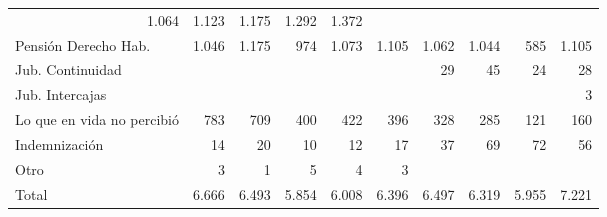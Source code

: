 \begin{tabular}{llllllllll}
  \multicolumn{1}{r}{1.064} &
  \multicolumn{1}{r}{1.123} &
  \multicolumn{1}{r}{1.175} &
  \multicolumn{1}{r}{1.292} &
  \multicolumn{1}{r}{1.372} \\
\multicolumn{1}{l}{\hspace{1em}Pensión Derecho Hab.} &
  \multicolumn{1}{|r}{1.046} &
  \multicolumn{1}{r}{1.175} &
  \multicolumn{1}{r}{974} &
  \multicolumn{1}{r}{1.073} &
  \multicolumn{1}{r}{1.105} &
  \multicolumn{1}{r}{1.062} &
  \multicolumn{1}{r}{1.044} &
  \multicolumn{1}{r}{585} &
  \multicolumn{1}{r}{1.105} \\
\multicolumn{1}{l}{\hspace{1em}Jub. Continuidad} &
  \multicolumn{1}{|r}{} &
  \multicolumn{1}{r}{} &
  \multicolumn{1}{r}{} &
  \multicolumn{1}{r}{} &
  \multicolumn{1}{r}{} &
  \multicolumn{1}{r}{29} &
  \multicolumn{1}{r}{45} &
  \multicolumn{1}{r}{24} &
  \multicolumn{1}{r}{28} \\
\multicolumn{1}{l}{\hspace{1em}Jub. Intercajas} &
  \multicolumn{1}{|r}{} &
  \multicolumn{1}{r}{} &
  \multicolumn{1}{r}{} &
  \multicolumn{1}{r}{} &
  \multicolumn{1}{r}{} &
  \multicolumn{1}{r}{} &
  \multicolumn{1}{r}{} &
  \multicolumn{1}{r}{} &
  \multicolumn{1}{r}{3} \\
\multicolumn{1}{l}{\hspace{1em}Lo que en vida no percibió} &
  \multicolumn{1}{|r}{783} &
  \multicolumn{1}{r}{709} &
  \multicolumn{1}{r}{400} &
  \multicolumn{1}{r}{422} &
  \multicolumn{1}{r}{396} &
  \multicolumn{1}{r}{328} &
  \multicolumn{1}{r}{285} &
  \multicolumn{1}{r}{121} &
  \multicolumn{1}{r}{160} \\
\multicolumn{1}{l}{\hspace{1em}Indemnización} &
  \multicolumn{1}{|r}{14} &
  \multicolumn{1}{r}{20} &
  \multicolumn{1}{r}{10} &
  \multicolumn{1}{r}{12} &
  \multicolumn{1}{r}{17} &
  \multicolumn{1}{r}{37} &
  \multicolumn{1}{r}{69} &
  \multicolumn{1}{r}{72} &
  \multicolumn{1}{r}{56} \\
\multicolumn{1}{l}{\hspace{1em}Otro} &
  \multicolumn{1}{|r}{3} &
  \multicolumn{1}{r}{1} &
  \multicolumn{1}{r}{5} &
  \multicolumn{1}{r}{4} &
  \multicolumn{1}{r}{3} &
  \multicolumn{1}{r}{} &
  \multicolumn{1}{r}{} &
  \multicolumn{1}{r}{} &
  \multicolumn{1}{r}{} \\
\multicolumn{1}{l}{\hspace{1em}Total} &
  \multicolumn{1}{|r}{6.666} &
  \multicolumn{1}{r}{6.493} &
  \multicolumn{1}{r}{5.854} &
  \multicolumn{1}{r}{6.008} &
  \multicolumn{1}{r}{6.396} &
  \multicolumn{1}{r}{6.497} &
  \multicolumn{1}{r}{6.319} &
  \multicolumn{1}{r}{5.955} &
  \multicolumn{1}{r}{7.221} \\
\cline{1-10}
\end{tabular}

